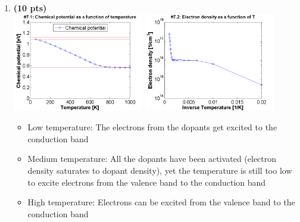 \documentclass[11pt]{article}
\begin{document}
\begin{enumerate}[resume]
\item \textbf{(10 pts)} \\
\includegraphics[width=0.45\textwidth]{F7_1.png}
\includegraphics[width=0.45\textwidth]{F7_2.png}

\begin{itemize}
\item Low temperature: The electrons from the dopants get excited to the conduction band
\item Medium temperature: All the dopants have been activated (electron density saturates to dopant density), yet the temperature is still too low to excite electrons from the valence band to the conduction band
\item High temperature: Electrons can be excited from the valence band to the conduction band
\end{itemize}




\end{enumerate}
\end{document}
